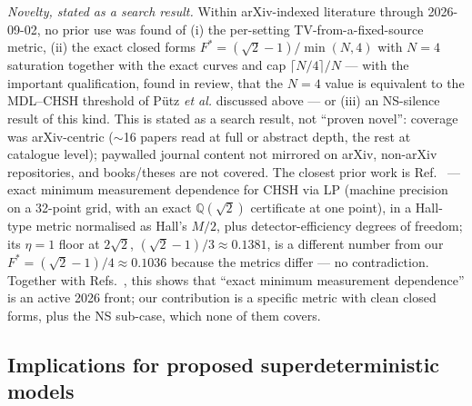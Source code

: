 \documentclass[aps,pra,reprint,superscriptaddress,floatfix]{revtex4-2}
\begin{document}
\emph{Novelty, stated as a search result.} Within arXiv-indexed literature
through 2026-09-02, no prior use was found of (i) the per-setting
TV-from-a-fixed-source metric, (ii) the exact closed forms
$F^*=(\sqrt2-1)/\min(N,4)$ with $N=4$ saturation together with the exact
curves and cap $\lceil N/4\rceil/N$ --- with the important qualification,
found in review, that the $N=4$ value is equivalent to the MDL--CHSH
threshold of P\"utz \emph{et al.} discussed above --- or (iii) an
NS-silence result of this kind. This is stated as a search result, not ``proven novel'': coverage was
arXiv-centric ($\sim$16 papers read at full or abstract depth, the rest at
catalogue level); paywalled journal content not mirrored on arXiv, non-arXiv
repositories, and books/theses are not covered. The closest prior work is
Ref.~ --- exact minimum measurement dependence for CHSH
via LP (machine precision on a 32-point grid, with an exact
$\mathbb{Q}(\sqrt2)$ certificate at one point), in a Hall-type metric
normalised as Hall's $M/2$, plus detector-efficiency degrees of freedom; its $\eta=1$ floor at $2\sqrt2$,
$(\sqrt2-1)/3\approx0.1381$, is a different number from our
$F^*=(\sqrt2-1)/4\approx0.1036$ because the metrics differ --- no
contradiction. Together with Refs.~,
this shows that ``exact minimum measurement dependence'' is an active 2026
front; our contribution is a specific metric with clean closed forms, plus
the NS sub-case, which none of them covers.

\subsection{Implications for proposed superdeterministic models}
\label{sec:superdet}
\end{document}
